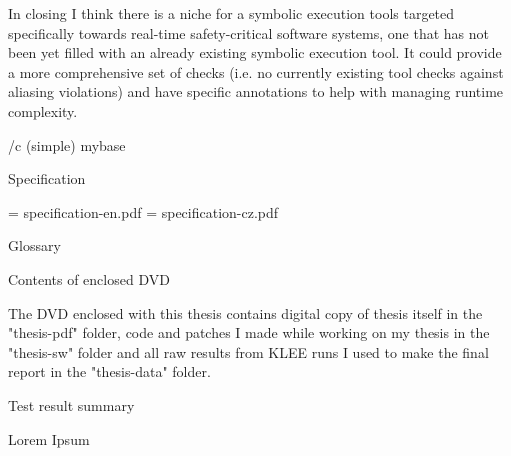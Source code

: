 In closing I think there is a niche for a symbolic execution tools targeted
specifically towards real-time safety-critical software systems, one that has
not been yet filled with an already existing symbolic execution tool. It could
provide a more comprehensive set of checks (i.e. no currently existing tool
checks against aliasing violations) and have specific annotations to help with
managing runtime complexity.



\nextoddpage

\bibchap
\usebib/c (simple) mybase


\app Specification

\picw=\hsize
\cinspic specification-en.pdf
\vskip-2cm
\vfil\break
\picw=\hsize
\cinspic specification-cz.pdf
\nextoddpage


\app Glossary\par
\makeglos

\nextoddpage

\app Contents of enclosed DVD

The DVD enclosed with this thesis contains digital copy of thesis itself in the
"thesis-pdf" folder, code and patches I made while working on my thesis in the
"thesis-sw" folder and all raw results from KLEE runs I used to make the final
report in the "thesis-data" folder.

\nextoddpage

\app Test result summary

Lorem Ipsum

\bye

